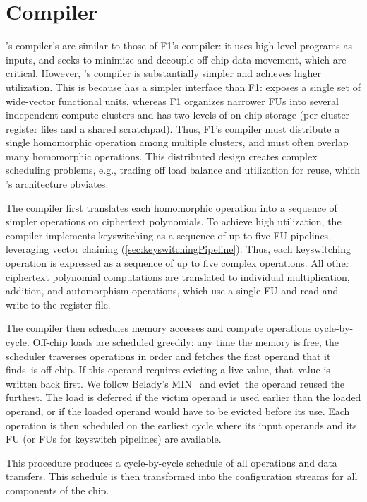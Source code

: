 \section{Compiler}\label{sec:algorithmicInsights}
\label{sec:compiler}

\name's compiler's are similar to those of F1's compiler: it uses high-level
programs as inputs, and seeks to minimize and decouple off-chip data movement,
which are critical. However, \name's compiler is substantially simpler and
achieves higher utilization. This is because \name has a simpler interface than
F1: \name exposes a single set of wide-vector functional units, whereas F1
organizes narrower FUs into several independent compute clusters and has two
levels of on-chip storage (per-cluster register files and a shared scratchpad).
Thus, F1's compiler must distribute a single homomorphic operation among
multiple clusters, and must often overlap many homomorphic operations. This
distributed design creates complex scheduling problems, e.g., trading off load
balance and utilization for reuse, which \name's architecture obviates.

The compiler first translates each homomorphic operation into a sequence of
simpler operations on ciphertext polynomials. To achieve high utilization, the
compiler implements keyswitching as a sequence of up to five FU pipelines,
leveraging vector chaining (\autoref{sec:keyswitchingPipeline}). Thus, each
keyswitching operation is expressed as a sequence of up to five complex
operations. All other ciphertext polynomial computations are translated to
individual multiplication, addition, and automorphism operations, which use a
single FU and read and write to the register file.

The compiler then schedules memory accesses and compute operations
cycle-by-cycle. Off-chip loads are scheduled greedily: any time the memory is
free, the scheduler traverses operations in order and fetches the first operand
that it finds~is off-chip. If this operand requires evicting a live value,
that~value is written back first. We follow Belady's MIN~\cite{belady1966study}
and evict~the operand reused the furthest. The load is deferred if the victim
operand is used earlier than the loaded operand, or if the loaded operand would
have to be evicted before its use. Each operation is then scheduled on the
earliest cycle where its input operands and its FU (or FUs for keyswitch
pipelines) are available.

This procedure produces a cycle-by-cycle schedule of all operations and data
transfers. This schedule is then transformed into the configuration streams for
all components of the chip.

